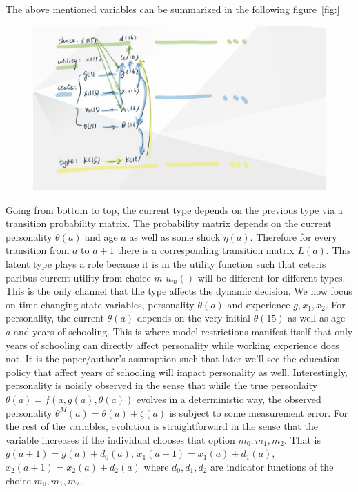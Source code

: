 \documentclass[12pt]{article}
\begin{document}
The above mentioned variables can be summarized in the following figure~\ref{fig:}
\begin{figure}
    \centering
    \includegraphics[]{../Figures/viz.jpg}
\end{figure}

Going from bottom to top, the current type depends on the previous type via a transition probability matrix. The probability matrix depends on the current personality $\theta(a)$ and age $a$ as well as some shock $\eta(a)$. Therefore for every transition from $a$ to $a+1$ there is a corresponding transition matrix $L(a)$. This latent type plays a role because it is in the utility function such that ceteris paribus current utility from choice $m$ $u_m()$ will be different for different types. This is the only channel that the type affects the dynamic decision. 
We now focus on time changing state variables, personality $\theta(a)$ and experience $g,x_1,x_2$. For personality, the current $\theta(a)$ depends on the very initial $\theta(15)$ as well as age $a$ and years of schooling. This is where model restrictions manifest itself that only years of schooling can directly affect personality while working experience does not. It is the paper/author's assumption such that later we'll see the education policy that affect years of schooling will impact personality as well. Interestingly, personality is noisily observed in the sense that while the true personlaity $\theta(a) = f(a,g(a),\theta(a))$ evolves in a deterministic way, the observed personality $\theta^M(a) = \theta(a) + \zeta(a)$ is subject to some measurement error. 
For the rest of the variables, evolution is straightforward in the sense that the variable increases if the individual chooses that option $m_0,m_1,m_2$. That is 
$g(a+1) = g(a) + d_0(a)$, $x_1(a+1) = x_1(a) + d_1(a)$, $x_2(a+1) = x_2(a) + d_2(a)$ where $d_0,d_1,d_2$ are indicator functions of the choice $m_0,m_1,m_2$.
\end{document}
